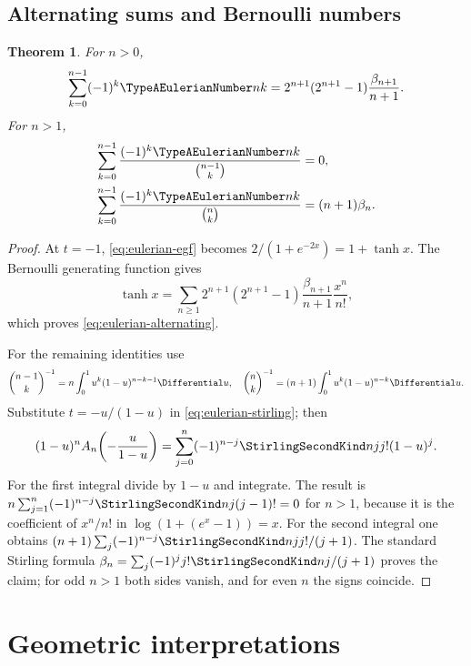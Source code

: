 \documentclass[11pt,a4paper,oneside,openany]{book}
\newtheorem{theorem}{Theorem}[chapter]
\theoremstyle{definition}
\theoremstyle{remark}
\begin{document}
\section{Alternating sums and Bernoulli numbers}
\begin{theorem}\label{thm:eulerian-alternating}
For $n>0$,
\begin{equation}\label{eq:eulerian-alternating}
 \sum_{k=0}^{n-1}(-1)^k\TypeAEulerianNumber nk
 =2^{n+1}(2^{n+1}-1)\frac{\beta_{n+1}}{n+1}.
\end{equation}
For $n>1$,
\begin{align}
 \sum_{k=0}^{n-1}\frac{(-1)^k\TypeAEulerianNumber nk}{\binom{n-1}{k}}&=0,
 \label{eq:eulerian-reciprocal-zero}\\
 \sum_{k=0}^{n-1}\frac{(-1)^k\TypeAEulerianNumber nk}{\binom nk}&=(n+1)\beta_n.
 \label{eq:eulerian-reciprocal-bernoulli}
\end{align}
\end{theorem}
\begin{proof}
At $t=-1$, \eqref{eq:eulerian-egf} becomes
$2/(1+e^{-2x})=1+\tanh x$.  The Bernoulli generating function gives
\[
 \tanh x=\sum_{n\ge1}
 2^{n+1}(2^{n+1}-1)\frac{\beta_{n+1}}{n+1}\frac{x^n}{n!},
\]
which proves \eqref{eq:eulerian-alternating}.

For the remaining identities use
\[
 \binom{n-1}{k}^{-1}=n\int_0^1u^k(1-u)^{n-k-1}\Differential u,
 \quad
 \binom nk^{-1}=(n+1)\int_0^1u^k(1-u)^{n-k}\Differential u.
\]
Substitute $t=-u/(1-u)$ in \eqref{eq:eulerian-stirling}; then
\begin{equation}\label{eq:eulerian-beta-transform}
 (1-u)^nA_n\!\left(-\frac{u}{1-u}\right)
 =\sum_{j=0}^{n}(-1)^{n-j}\StirlingSecondKind njj!(1-u)^j.
\end{equation}
For the first integral divide by $1-u$ and integrate.  The result is
$n\sum_{j=1}^n(-1)^{n-j}\StirlingSecondKind nj(j-1)!=0$ for $n>1$, because it is the
coefficient of $x^n/n!$ in
$\log(1+(e^x-1))=x$.  For the second integral one obtains
$(n+1)\sum_j(-1)^{n-j}\StirlingSecondKind njj!/(j+1)$.  The standard Stirling formula
$\beta_n=\sum_j(-1)^jj!\StirlingSecondKind nj/(j+1)$ proves the claim; for odd $n>1$ both
sides vanish, and for even $n$ the signs coincide.
\end{proof}

\chapter{Geometric interpretations}
\end{document}
